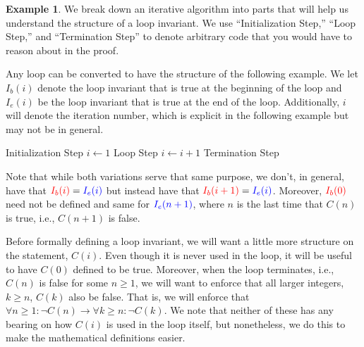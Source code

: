 \documentclass{article}
\theoremstyle{plain}
\theoremstyle{definition}
\newtheorem{example}[theorem]{Example}
\newcommand{\ra}{\rightarrow}
\begin{document}
\begin{example}\label{ex_loop_inv_b_e}
    We break down an iterative algorithm into parts that will help us understand the structure of a loop invariant. We use ``Initialization Step,'' ``Loop Step,'' and ``Termination Step'' to denote arbitrary code that you would have to reason about in the proof.
    
    Any loop can be converted to have the structure of the following example. We let {\color{red}\(I_b(i)\)} denote the loop invariant that is true at the beginning of the loop and {\color{blue}\(I_e(i)\)} be the loop invariant that is true at the end of the loop. Additionally, \(i\) will denote the iteration number, which is explicit in the following example but may not be in general.
    \begin{center}
    \begin{minipage}{.5\linewidth}
    \begin{algorithmic}[1]
        \State Initialization Step
        \State \(i \leftarrow 1\)
            \State Loop Step
            \State \(i \leftarrow i + 1\)
        \EndWhile
        \State Termination Step
    \end{algorithmic}
    \end{minipage}
    \end{center}
Note that while both variations serve that same purpose, we don't, in general, have that \({\color{red}I_b(i)} = {\color{blue}I_e(i)}\) but instead have that \({\color{red}I_b(i+1)} = {\color{blue}I_e(i)}\). Moreover, \(\color{red}I_b(0)\) need not be defined and same for \(\color{blue}I_e(n+1)\), where \(n\) is the last time that \(C(n)\) is true, i.e., \(C(n+1)\) is false. 
\end{example}

Before formally defining a loop invariant, we will want a little more structure on the statement, \(C(i)\). Even though it is never used in the loop, it will be useful to have \(C(0)\) defined to be true. Moreover, when the loop terminates, i.e., \(C(n)\) is false for some \(n \geq 1\), we will want to enforce that all larger integers, \(k \geq n\), \(C(k)\) also be false. That is, we will enforce that \(\forall n \geq 1 : \lnot C(n) \ra \forall k \geq n : \lnot C(k)\). We note that neither of these has any bearing on how \(C(i)\) is used in the loop itself, but nonetheless, we do this to make the mathematical definitions easier.
\end{document}

